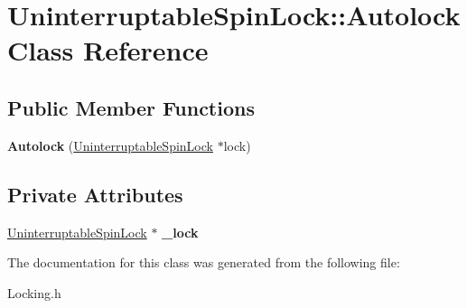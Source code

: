 \hypertarget{class_uninterruptable_spin_lock_1_1_autolock}{}\section{Uninterruptable\+Spin\+Lock\+:\+:Autolock Class Reference}
\label{class_uninterruptable_spin_lock_1_1_autolock}
\subsection*{Public Member Functions}
\begin{DoxyCompactItemize}
\item 
\mbox{\label{class_uninterruptable_spin_lock_1_1_autolock_ae4929dda4d5292dbacaeb53989951ce7}} 
{\bfseries Autolock} (\hyperlink{class_uninterruptable_spin_lock}{Uninterruptable\+Spin\+Lock} $\ast$lock)
\end{DoxyCompactItemize}
\subsection*{Private Attributes}
\begin{DoxyCompactItemize}
\item 
\mbox{\label{class_uninterruptable_spin_lock_1_1_autolock_a5c3a2646096d5c130363e006c1da2113}} 
\hyperlink{class_uninterruptable_spin_lock}{Uninterruptable\+Spin\+Lock} $\ast$ {\bfseries \+\_\+lock}
\end{DoxyCompactItemize}


The documentation for this class was generated from the following file\+:\begin{DoxyCompactItemize}
\item 
Locking.\+h\end{DoxyCompactItemize}
